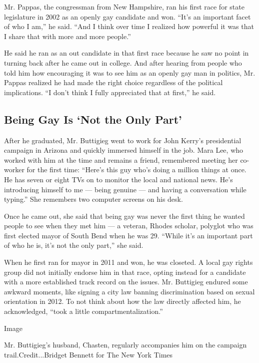 Mr. Pappas, the congressman from New Hampshire, ran his first race for
state legislature in 2002 as an openly gay candidate and won. ``It's an
important facet of who I am,'' he said. ``And I think over time I
realized how powerful it was that I share that with more and more
people.''

He said he ran as an out candidate in that first race because he saw no
point in turning back after he came out in college. And after hearing
from people who told him how encouraging it was to see him as an openly
gay man in politics, Mr. Pappas realized he had made the right choice
regardless of the political implications. ``I don't think I fully
appreciated that at first,'' he said.

\hypertarget{being-gay-is-not-the-only-part}{%
\subsection{Being Gay Is `Not the Only
Part'}\label{being-gay-is-not-the-only-part}}

After he graduated, Mr. Buttigieg went to work for John Kerry's
presidential campaign in Arizona and quickly immersed himself in the
job. Mara Lee, who worked with him at the time and remains a friend,
remembered meeting her co-worker for the first time: ``Here's this guy
who's doing a million things at once. He has seven or eight TVs on to
monitor the local and national news. He's introducing himself to me ---
being genuine --- and having a conversation while typing.'' She
remembers two computer screens on his desk.

Once he came out, she said that being gay was never the first thing he
wanted people to see when they met him --- a veteran, Rhodes scholar,
polyglot who was first elected mayor of South Bend when he was 29.
``While it's an important part of who he is, it's not the only part,''
she said.

When he first ran for mayor in 2011 and won, he was closeted. A local
gay rights group did not initially endorse him in that race, opting
instead for a candidate with a more established track record on the
issues. Mr. Buttigieg endured some awkward moments, like signing a city
law banning discrimination based on sexual orientation in 2012. To not
think about how the law directly affected him, he acknowledged, ``took a
little compartmentalization.''

Image

Mr. Buttigieg's husband, Chasten, regularly accompanies him on the
campaign trail.Credit...Bridget Bennett for The New York Times

